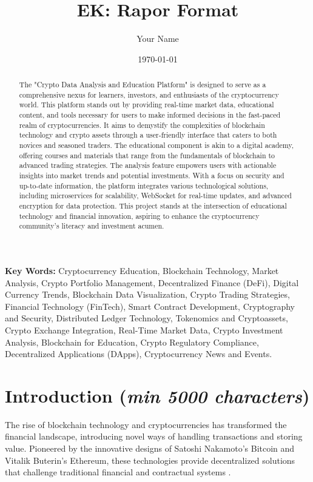 \documentclass[12pt]{report}
\title{EK: Rapor Format}
\author{Your Name}
\date{\today}
\renewcommand{\thesection}{\arabic{section}}
\newcommand{\characters}[1]{(\textit{min #1 characters})}
\begin{document}
\maketitle

\begin{abstract}
The "Crypto Data Analysis and Education Platform" is designed to serve as a comprehensive nexus for learners, investors, and enthusiasts of the cryptocurrency world. This platform stands out by providing real-time market data, educational content, and tools necessary for users to make informed decisions in the fast-paced realm of cryptocurrencies. It aims to demystify the complexities of blockchain technology and crypto assets through a user-friendly interface that caters to both novices and seasoned traders. The educational component is akin to a digital academy, offering courses and materials that range from the fundamentals of blockchain to advanced trading strategies. The analysis feature empowers users with actionable insights into market trends and potential investments. With a focus on security and up-to-date information, the platform integrates various technological solutions, including microservices for scalability, WebSocket for real-time updates, and advanced encryption for data protection. This project stands at the intersection of educational technology and financial innovation, aspiring to enhance the cryptocurrency community's literacy and investment acumen.
\end{abstract}


\textbf{Key Words:} Cryptocurrency Education, Blockchain Technology, Market Analysis, Crypto Portfolio Management, Decentralized Finance (DeFi), Digital Currency Trends, Blockchain Data Visualization, Crypto Trading Strategies, Financial Technology (FinTech), Smart Contract Development, Cryptography and Security, Distributed Ledger Technology, Tokenomics and Cryptoassets, Crypto Exchange Integration, Real-Time Market Data, Crypto Investment Analysis, Blockchain for Education, Crypto Regulatory Compliance, Decentralized Applications (DApps), Cryptocurrency News and Events.


\tableofcontents
\renewcommand{\thechapter}{\arabic{chapter}}
\renewcommand{\thesection}{\arabic{section}}
\setcounter{secnumdepth}{3} %
\setcounter{tocdepth}{3} %

\newpage

\section{Introduction \characters{5000}}
The rise of blockchain technology and cryptocurrencies has transformed the financial landscape, introducing novel ways of handling transactions and storing value. Pioneered by the innovative designs of Satoshi Nakamoto's Bitcoin and Vitalik Buterin's Ethereum, these technologies provide decentralized solutions that challenge traditional financial and contractual systems \cite{nakamoto2008, buterin2014}.
\end{document}
